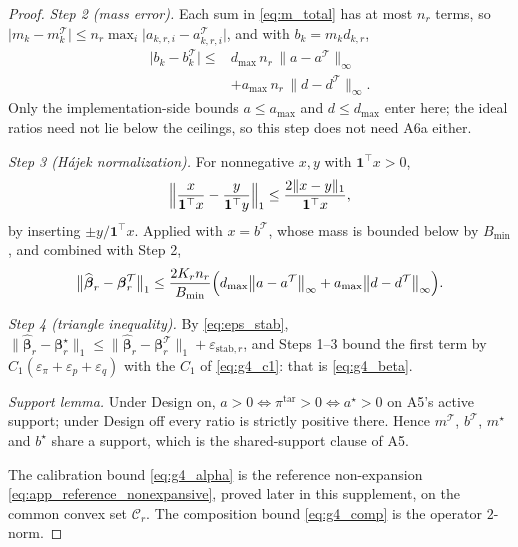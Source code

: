 \begin{proof}
\emph{Step 2 (mass error).}  Each sum in \eqref{eq:m_total} has at most $n_r$
terms, so
$\lvert m_k-m^{\mathcal T}_{k}\rvert
\le n_r\max_i\lvert a_{k,r,i}-a^{\mathcal T}_{k,r,i}\rvert$, and with
$b_k=m_kd_{k,r}$,
\begin{equation}
\begin{aligned}
 \bigl\lvert b_k-b^{\mathcal T}_k\bigr\rvert
 \le{}&
 d_{\max}\,n_r\,\bigl\|a-a^{\mathcal T}\bigr\|_\infty\\
 &+a_{\max}\,n_r\,\bigl\|d-d^{\mathcal T}\bigr\|_\infty .
\end{aligned}
 \label{eq:app_plugin_mass}
\end{equation}
Only the implementation-side bounds $a\le a_{\max}$ and $d\le d_{\max}$ enter
here; the ideal ratios need not lie below the ceilings, so this step does not
need A6a either.

\emph{Step 3 (H\'ajek normalization).}  For nonnegative $x,y$ with
$\mathbf{1}^{\top}x>0$,
\[
\Bigl\|\frac{x}{\mathbf{1}^{\top}x}
-\frac{y}{\mathbf{1}^{\top}y}\Bigr\|_1
\le\frac{2\|x-y\|_1}{\mathbf{1}^{\top}x},
\]
by inserting $\pm y/\mathbf{1}^{\top}x$.  Applied with $x=b^{\mathcal T}$,
whose mass is bounded below by $B_{\min}$, and combined with Step 2,
\[
\bigl\|\widehat{\boldsymbol\beta}_r
-\boldsymbol\beta_r^{\mathcal T}\bigr\|_1
\le
\frac{2K_rn_r}{B_{\min}}
\Bigl(
d_{\max}\bigl\|a-a^{\mathcal T}\bigr\|_\infty
+a_{\max}\bigl\|d-d^{\mathcal T}\bigr\|_\infty
\Bigr).
\]

\emph{Step 4 (triangle inequality).}  By \eqref{eq:eps_stab},
$\|\widehat{\boldsymbol\beta}_r-\boldsymbol\beta_r^\star\|_1
\le\|\widehat{\boldsymbol\beta}_r-\boldsymbol\beta_r^{\mathcal T}\|_1
+\varepsilon_{\mathrm{stab},r}$, and Steps 1--3 bound the first term by
$C_1(\varepsilon_\pi+\varepsilon_p+\varepsilon_q)$ with the $C_1$ of
\eqref{eq:g4_c1}: that is \eqref{eq:g4_beta}.

\emph{Support lemma.}  Under Design on,
$a>0\iff\pi^{\mathrm{tar}}>0\iff a^\star>0$ on A5's active support; under
Design off every ratio is strictly positive there.  Hence $m^{\mathcal T}$,
$b^{\mathcal T}$, $m^\star$ and $b^\star$ share a support, which is the
shared-support clause of A5.

The calibration bound \eqref{eq:g4_alpha} is the reference
non-expansion \eqref{eq:app_reference_nonexpansive}, proved later in this supplement, on the common
convex set $\mathcal{C}_r$.  The composition bound
\eqref{eq:g4_comp} is the operator $2$-norm.
\end{proof}

